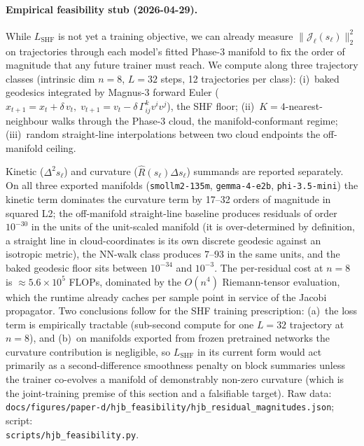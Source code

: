 \documentclass[11pt]{article}
\begin{document}
\paragraph{Empirical feasibility stub (2026-04-29).}
While $L_\text{SHF}$ is not yet a training objective, we can already
measure $\bigl\|\mathcal{J}_\ell(s_\ell)\bigr\|_2^2$ on trajectories
through each model's fitted Phase-3 manifold to fix the order of
magnitude that any future trainer must reach. We compute
 along three trajectory classes (intrinsic
dim $n{=}8$, $L{=}32$ steps, 12 trajectories per class):
(i)~baked geodesics integrated by Magnus-3 forward Euler
($x_{t+1}{=}x_t{+}\delta\,v_t,\;
v_{t+1}{=}v_t{-}\delta\,\Gamma^k_{ij}v^iv^j$), the SHF
floor;
(ii)~$K{=}4$-nearest-neighbour walks through the Phase-3 cloud, the
manifold-conformant regime;
(iii)~random straight-line interpolations between two cloud endpoints
the off-manifold ceiling.

Kinetic ($\Delta^2 s_\ell$) and curvature
($\hat R(s_\ell)\Delta s_\ell$) summands are reported separately. On
all three exported manifolds (\texttt{smollm2-135m},
\texttt{gemma-4-e2b}, \texttt{phi-3.5-mini}) the kinetic term dominates
the curvature term by 17--32 orders of magnitude in squared L2; the
off-manifold straight-line baseline produces residuals of order
$10^{-30}$ in the units of the unit-scaled manifold (it is
over-determined by definition, a straight line in cloud-coordinates
is its own discrete geodesic against an isotropic metric), the
NN-walk class produces $7$--$93$ in the same units, and the baked
geodesic floor sits between $10^{-34}$ and $10^{-3}$. The per-residual
cost at $n{=}8$ is $\approx\!5.6\!\times\!10^{5}$ FLOPs, dominated by
the $O(n^4)$ Riemann-tensor evaluation, which the runtime already
caches per sample point in service of the Jacobi propagator.
Two conclusions follow for the SHF training prescription:
(a)~the loss term is empirically tractable (sub-second compute for one
$L{=}32$ trajectory at $n{=}8$), and
(b)~on manifolds exported from frozen pretrained networks the
curvature contribution is negligible, so $L_\text{SHF}$ in its current
form would act primarily as a second-difference smoothness penalty
on block summaries unless the trainer co-evolves a manifold of
demonstrably non-zero curvature (which is the joint-training premise
of this section and a falsifiable target). Raw data:
\texttt{docs/figures/paper-d/hjb\_feasibility/hjb\_residual\_magnitudes.json};
script:\\
\texttt{scripts/hjb\_feasibility.py}.

\clearpage
\printbibliography
\end{document}
